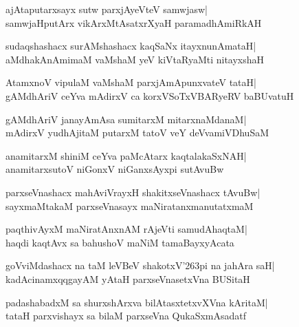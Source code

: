 \documentclass[twoside,12pt,openright]{book}
\def\S{\char'263}
\newcounter{shloka}[chapter]
\begin{document}
\begin{shloka}%
ajAtaputarxsayx sutw parxjAyeVteV samwjasw|\\
samwjaHputArx vikArxMtAsatxrXyaH paramadhAmiRkAH
\end{shloka}

\begin{shloka}%
sudaqshashacx surAMshashacx kaqSaNx itayxnunAmataH|\\
aMdhakAnAmimaM vaMshaM yeV kiVtaRyaMti nitayxshaH
\end{shloka}

\begin{shloka}%
AtamxnoV vipulaM vaMshaM parxjAmApunxvateV tataH|\\
gAMdhAriV ceYva mAdirxV ca korxVSoTxVBARyeRV baBUvatuH
\end{shloka}

\begin{shloka}%
gAMdhAriV janayAmAsa sumitarxM mitarxnaMdanaM|\\
mAdirxV yudhAjitaM putarxM tatoV veY deVvamiVDhuSaM
\end{shloka}

\begin{shloka}%
anamitarxM shiniM ceYva paMcAtarx kaqtalakaSxNAH|\\
anamitarxsutoV niGonxV niGanxsAyxpi sutAvuBw
\end{shloka}

\begin{shloka}%
parxseVnashacx mahAviVrayxH shakitxseVnashacx tAvuBw|\\
sayxmaMtakaM parxseVnasayx maNiratanxmanutatxmaM
\end{shloka}

\begin{shloka}%
paqthivAyxM maNiratAnxnAM rAjeVti samudAhaqtaM|\\
haqdi kaqtAvx sa bahushoV maNiM tamaBayxyAcata
\end{shloka}

\begin{shloka}%
goVviMdashacx na taM leVBeV shakotxV\S pi na jahAra saH|\\
kadAcinamxqqgayAM yAtaH parxseVnasetxVna BUSitaH
\end{shloka}

\begin{shloka}%
padashabadxM sa shurxshArxva bilAtasxtetxvXVna kAritaM|\\
tataH parxvishayx sa bilaM parxseVna QukaSxmAsadatf
\end{shloka}
\end{document}
